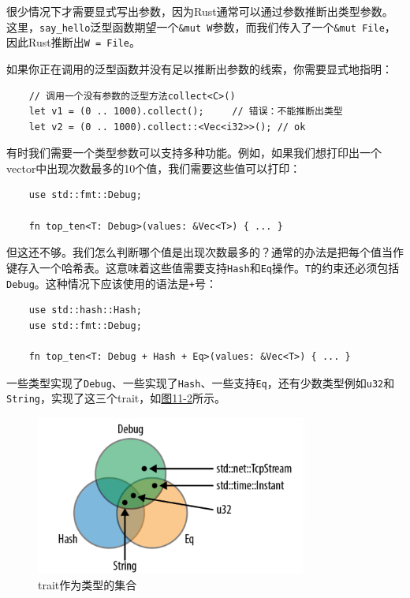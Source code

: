 很少情况下才需要显式写出参数，因为Rust通常可以通过参数推断出类型参数。这里，\texttt{say\_hello}泛型函数期望一个\texttt{\&mut W}参数，而我们传入了一个\texttt{\&mut File}，因此Rust推断出\texttt{W = File}。

如果你正在调用的泛型函数并没有足以推断出参数的线索，你需要显式地指明：
\begin{verbatim}
    // 调用一个没有参数的泛型方法collect<C>()
    let v1 = (0 .. 1000).collect();     // 错误：不能推断出类型
    let v2 = (0 .. 1000).collect::<Vec<i32>>(); // ok
\end{verbatim}

有时我们需要一个类型参数可以支持多种功能。例如，如果我们想打印出一个vector中出现次数最多的10个值，我们需要这些值可以打印：
\begin{verbatim}
    use std::fmt::Debug;

    fn top_ten<T: Debug>(values: &Vec<T>) { ... }
\end{verbatim}

但这还不够。我们怎么判断哪个值是出现次数最多的？通常的办法是把每个值当作键存入一个哈希表。这意味着这些值需要支持\texttt{Hash}和\texttt{Eq}操作。\texttt{T}的约束还必须包括\texttt{Debug}。这种情况下应该使用的语法是\texttt{+}号：
\begin{verbatim}
    use std::hash::Hash;
    use std::fmt::Debug;

    fn top_ten<T: Debug + Hash + Eq>(values: &Vec<T>) { ... }
\end{verbatim}

一些类型实现了\texttt{Debug}、一些实现了\texttt{Hash}、一些支持\texttt{Eq}，还有少数类型例如\texttt{u32}和\texttt{String}，实现了这三个trait，如\hyperref[f11-2]{图11-2}所示。

\begin{figure}[htbp]
    \centering
    \includegraphics[width=0.8\textwidth]{../img/f11-2.png}
    \caption{trait作为类型的集合}
    \label{f11-2}
\end{figure}

